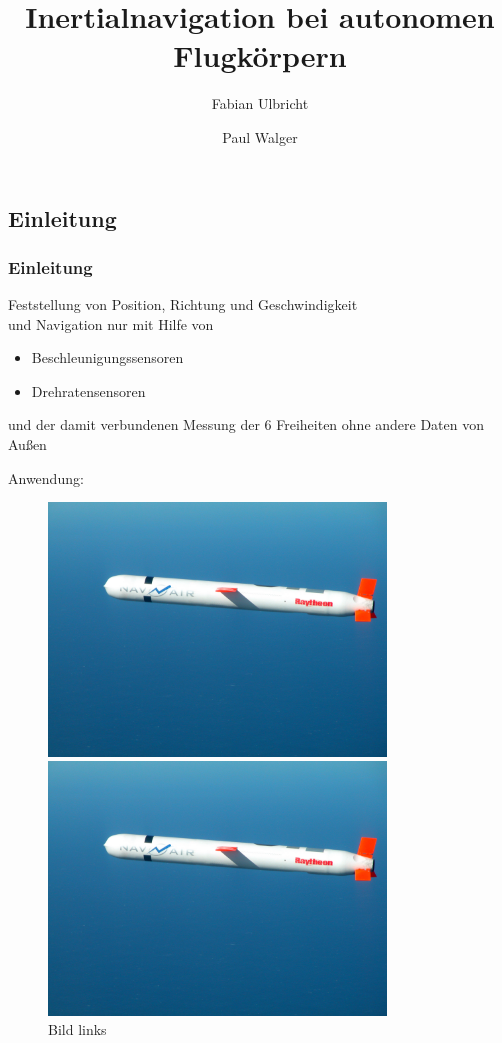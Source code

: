 \documentclass[10pt,a4paper,oneside]{beamer}
\title{Inertialnavigation bei autonomen Flugkörpern}
\author{
	Fabian Ulbricht \and
	Paul Walger 
}
\begin{document}
\frame{
	\titlepage
}


\begin{frame}
  \section{Einleitung}
  \frametitle{Einleitung}
  \begin{definition}[Inertialnavigation]
  Feststellung von Position, Richtung und Geschwindigkeit\\
  und Navigation nur mit Hilfe von
  \begin{itemize}
  \item Beschleunigungssensoren
  \item Drehratensensoren
  \end{itemize}
  und der damit verbundenen Messung der 6 Freiheiten ohne andere Daten von Außen
  \end{definition}
  Anwendung:
  \begin{figure}[htbp]
      \begin{minipage}{0.3\textwidth}
       \centering
        \includegraphics[width=0.8\textwidth]{images/cruise_missle.jpg}
        \caption{Bild links}
      \end{minipage}\hfill
      \begin{minipage}{0.3\textwidth}
       \centering
        \includegraphics[width=0.8\textwidth]{images/cruise_missle.jpg}

\end{minipage}
\end{figure}
\end{frame}
\end{document}
